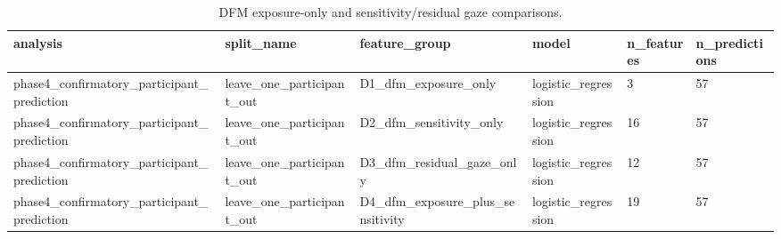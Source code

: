 \begin{table}[t]
\centering
\small
\caption{DFM exposure-only and sensitivity/residual gaze comparisons.}
\label{tab:dfm-exposure-sensitivity}
\begin{tabular}{llllll}
\toprule
analysis & split\_name & feature\_group & model & n\_features & n\_predictions \\
\midrule
phase4\_confirmatory\_participant\_prediction & leave\_one\_participant\_out & D1\_dfm\_exposure\_only & logistic\_regression & 3 & 57 \\
phase4\_confirmatory\_participant\_prediction & leave\_one\_participant\_out & D2\_dfm\_sensitivity\_only & logistic\_regression & 16 & 57 \\
phase4\_confirmatory\_participant\_prediction & leave\_one\_participant\_out & D3\_dfm\_residual\_gaze\_only & logistic\_regression & 12 & 57 \\
phase4\_confirmatory\_participant\_prediction & leave\_one\_participant\_out & D4\_dfm\_exposure\_plus\_sensitivity & logistic\_regression & 19 & 57 \\
\bottomrule
\end{tabular}
\end{table}
